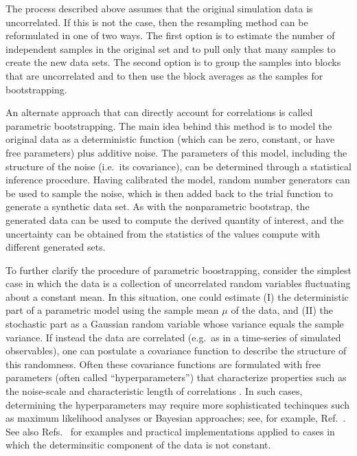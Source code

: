 The process described above assumes that the original simulation data is uncorrelated.  If this is not the case, then the resampling method can be reformulated in one of two ways.  The first option is to estimate the number of independent samples in the original set and to pull only that many samples to create the new data sets.  The second option is to group the samples into blocks that are uncorrelated and to then use the block averages as the samples for bootstrapping.  

An alternate approach that can directly account for correlations is called parametric bootstrapping.  The main idea behind this method is to model the original data as a deterministic function (which can be zero, constant, or have free parameters) plus additive noise.  The parameters of this model, including the structure of the noise (i.e.\ its covariance), can be determined through a statistical inference procedure.  Having calibrated the model, random number generators can be used to sample the noise, which is then added back to the trial function to generate a synthetic data set.   As with the nonparametric bootstrap, the generated data can be used to compute the derived quantity of interest, and the uncertainty can be obtained from the statistics of the values compute with different generated sets.

To further clarify the procedure of parametric boostrapping, consider the simplest case in which the data is a collection of uncorrelated random variables fluctuating about a constant mean.  In this situation, one could estimate (I) the deterministic part of a parametric model using the sample mean $\mu$ of the data, and (II) the stochastic part as a Gaussian random variable whose variance equals the sample variance.  If instead the data are correlated (e.g.\ as in a time-series of simulated observables),  one can postulate a covariance function to describe the structure of this randomness.  Often these covariance functions are formulated with free parameters (often called ``hyperparameters'') that characterize properties such as the noise-scale and characteristic length of correlations \cite{Rasmussen}.  In such cases, determining the hyperparameters may require more sophisticated techinques such as maximum likelihood analyses or Bayesian approaches; see, for example, Ref.~\cite{Rasmussen}.  See also Refs.~\cite{patrone1,patrone2,patrone3,Boettinger2017} for examples and practical implementations applied to cases in which the determinsitic component of the data is not constant.  


